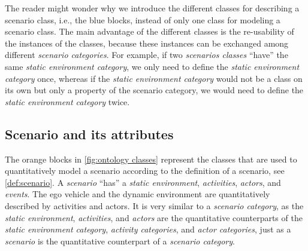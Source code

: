 
The reader might wonder why we introduce the different classes for describing a scenario class, i.e., the blue blocks, instead of only one class for modeling a scenario class. 
The main advantage of the different classes is the re-usability of the instances of the classes, because these instances can be exchanged among different \textit{scenario categories}. For example, if two \textit{scenarios classes} ``have'' the same \textit{static environment category}, we only need to define the \textit{static environment category} once, whereas if the \textit{static environment category} would not be a class on its own but only a property of the scenario category, we would need to define the \textit{static environment category} twice.



\subsection{Scenario and its attributes}
\label{sec:domain scenario}

The orange blocks in \cref{fig:ontology classes} represent the classes that are used to quantitatively model a scenario according to the definition of a scenario, see \cref{def:scenario}. A \textit{scenario} ``has'' a \textit{static environment}, \textit{activities}, \textit{actors}, and \textit{events}. 
The ego vehicle and the dynamic environment are quantitatively described by activities and actors. 
It is very similar to a \textit{scenario category}, as the \textit{static environment}, \textit{activities}, and \textit{actors} are the quantitative counterparts of the \textit{static environment category}, \textit{activity categories}, and \textit{actor categories}, just as a \textit{scenario} is the quantitative counterpart of a \textit{scenario category}. 

